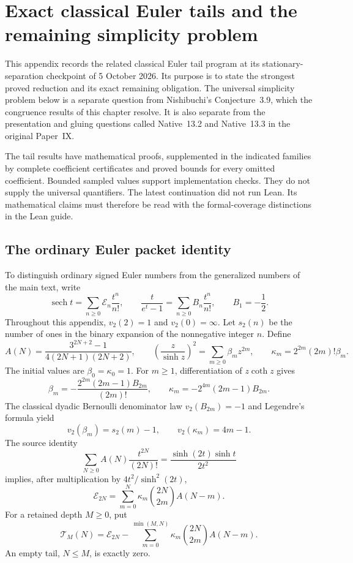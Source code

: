 \section{Exact classical Euler tails and the remaining simplicity problem}
\label{app:root:scope}

This appendix records the related classical Euler tail program at its
stationary-separation checkpoint of 5 October 2026. Its purpose is to state
the strongest proved reduction and its exact remaining obligation. The
universal simplicity problem below is a separate question from
Nishibuchi's Conjecture~3.9, which the congruence results of this chapter
resolve. It is also separate from the presentation and gluing questions
called Native~13.2 and Native~13.3 in the original Paper~IX.

The tail results have mathematical proofs, supplemented in the indicated
families by complete coefficient certificates and proved bounds for every
omitted coefficient. Bounded sampled values support implementation checks.
They do not supply the universal quantifiers. The latest continuation did
not run Lean. Its mathematical claims must therefore be read with the
formal-coverage distinctions in the Lean guide.

\subsection{The ordinary Euler packet identity}
\label{app:root:identity}

To distinguish ordinary signed Euler numbers from the generalized numbers
of the main text, write
\[
 \operatorname{sech}t=\sum_{n\ge0}\mathcal E_n\frac{t^n}{n!},
 \qquad \frac{t}{e^t-1}=\sum_{n\ge0}B_n\frac{t^n}{n!},
 \qquad B_1=-\frac12.
\]
Throughout this appendix, $v_2(2)=1$ and $v_2(0)=\infty$.
Let $s_2(n)$ be the number of ones in the binary expansion of the
nonnegative integer $n$. Define
\[
 A(N)=\frac{3^{2N+2}-1}{4(2N+1)(2N+2)},\qquad
 \left(\frac z{\sinh z}\right)^2=\sum_{m\ge0}\beta_m z^{2m},
 \qquad \kappa_m=2^{2m}(2m)!\beta_m.
\]
The initial values are $\beta_0=\kappa_0=1$. For $m\ge1$, differentiation
of $z\coth z$ gives
\begin{equation}
 \beta_m=-\frac{2^{2m}(2m-1)B_{2m}}{(2m)!},\qquad
 \kappa_m=-2^{4m}(2m-1)B_{2m}.
 \label{eq:root:beta}
\end{equation}
The classical dyadic Bernoulli denominator law
$v_2(B_{2m})=-1$ and Legendre's formula yield
\begin{equation}
 v_2(\beta_m)=s_2(m)-1,\qquad
 v_2(\kappa_m)=4m-1.\label{eq:root:weights}
\end{equation}
The source identity
\[
 \sum_{N\ge0}A(N)\frac{t^{2N}}{(2N)!}
 =\frac{\sinh(2t)\sinh t}{2t^2}
\]
implies, after multiplication by $4t^2/\sinh^2(2t)$,
\begin{equation}
 \mathcal E_{2N}=\sum_{m=0}^N
    \kappa_m\binom{2N}{2m}A(N-m).
 \label{eq:root:packet}
\end{equation}
For a retained depth $M\ge0$, put
\[
 \mathcal T_M(N)=\mathcal E_{2N}
   -\sum_{m=0}^{\min(M,N)}\kappa_m\binom{2N}{2m}A(N-m).
\]
An empty tail, $N\le M$, is exactly zero.

